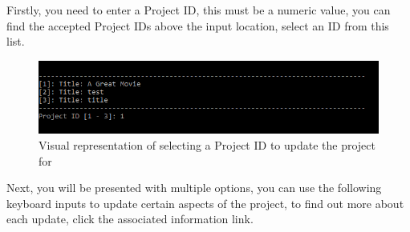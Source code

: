 \documentclass[
  english,
  a4paper,
,tablecaptionabove
]{scrartcl}
\begin{document}
Firstly, you need to enter a Project ID, this must be a numeric value,
you can find the accepted Project IDs above the input location, select
an ID from this list.

\begin{figure}
\centering
\includegraphics{images/user-guide/maintenance-mode/update-project-select-id.png}
\caption{Visual representation of selecting a Project ID to update the
project for}
\end{figure}

Next, you will be presented with multiple options, you can use the
following keyboard inputs to update certain aspects of the project, to
find out more about each update, click the associated information link.
\end{document}
